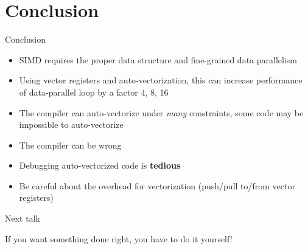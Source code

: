 \documentclass{beamer}
\begin{document}
\section{Conclusion}
\begin{frame}{Conclusion}
\begin{itemize}
    \item SIMD requires the proper data structure and fine-grained data parallelism 
    \item Using vector registers and auto-vectorization, this can increase performance of data-parallel loop by a factor 4, 8, 16
    \item The compiler can auto-vectorize under \textit{many} constraints, some code may be impossible to auto-vectorize
    \item The compiler can be wrong
    \item Debugging auto-vectorized code is \textbf{tedious}
    \item Be careful about the overhead for vectorization (push/pull to/from vector registers)
\end{itemize}

\end{frame}
\begin{frame}{Next talk}
    \begin{center}
        \Huge If you want something done right, you have to do it yourself!
    \end{center}
\end{frame}
\end{document}

